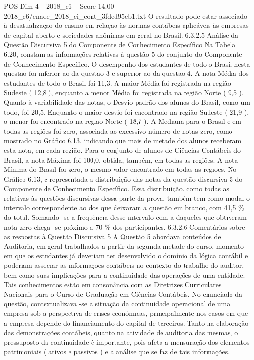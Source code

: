 \begin{textsample}{POS Dim 4 – 2018\_c6 – Score 14.00 – 2018\_c6/enade\_2018\_ci\_cont\_3fded95eb1.txt}
O resultado pode estar associado à desatualização do ensino em relação às normas contábeis aplicáveis às empresas de capital aberto e sociedades anônimas em geral no Brasil. 6.3.2.5 Análise da Questão Discursiva 5 do Componente de Conhecimento Específico Na Tabela 6.20, constam as informações relativas à questão 5 do conjunto do Componente de Conhecimento Específico.
O desempenho dos estudantes de todo o Brasil nesta questão foi inferior ao da questão 3 e superior ao da questão 4.
A nota Média dos estudantes de todo o Brasil foi 11,3.
A maior Média foi registrada na região Sudeste ( 12,8 ), enquanto a menor Média foi registrada na região Norte ( 9,5 ).
Quanto à variabilidade das notas, o Desvio padrão dos alunos do Brasil, como um todo, foi 20,5.
Enquanto o maior desvio foi encontrado na região Sudeste ( 21,9 ), o menor foi encontrado na região Norte ( 18,7 ).
A Mediana para o Brasil e em todas as regiões foi zero, associada ao excessivo número de notas zero, como mostrado no Gráfico 6.13, indicando que mais de metade dos alunos receberam esta nota, em cada região.
Para o conjunto de alunos de Ciências Contábeis do Brasil, a nota Máxima foi 100,0, obtida, também, em todas as regiões.
A nota Mínima do Brasil foi zero, o mesmo valor encontrado em todas as regiões.
No Gráfico 6.13, é representada a distribuição das notas da questão discursiva 5 do Componente de Conhecimento Específico.
Essa distribuição, como todas as relativas às questões discursivas dessa parte da prova, também tem como modal o intervalo correspondente ao dos que deixaram a questão em branco, com 41,5 \% do total.
Somando -se a frequência desse intervalo com a daqueles que obtiveram nota zero chega -se próximo a 70 \% dos participantes. 6.3.2.6 Comentários sobre as respostas à Questão Discursiva 5 A Questão 5 abordava conteúdos de Auditoria, em geral trabalhados a partir da segunda metade do curso, momento em que os estudantes já deveriam ter desenvolvido o domínio da lógica contábil e poderiam associar as informações contábeis no contexto do trabalho do auditor, bem como suas implicações para a continuidade das operações de uma entidade.
Tais conhecimentos estão em consonância com as Diretrizes Curriculares Nacionais para o Curso de Graduação em Ciências Contábeis.
No enunciado da questão, contextualizava -se a situação da continuidade operacional de uma empresa sob a perspectiva de crises econômicas, principalmente nos casos em que a empresa depende do financiamento do capital de terceiros.
Tanto na elaboração das demonstrações contábeis, quanto na atividade de auditoria das mesmas, o pressuposto da continuidade é importante, pois afeta a mensuração dos elementos patrimoniais ( ativos e passivos ) e a análise que se faz de tais informações.

\end{textsample}
